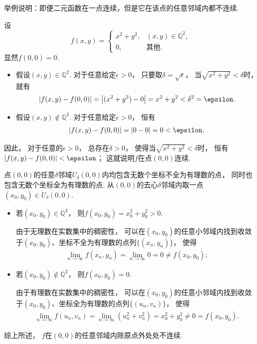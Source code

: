 \begin{example}
举例说明：即便二元函数在一点连续，但是它在该点的任意邻域内都不连续.
\begin{solution}
设\begin{equation*}
	f(x,y) = \begin{cases}
		x^2+y^2, & (x,y) \in \mathbb{Q}^2, \\
		0, & \text{其他}.
	\end{cases}
\end{equation*}
显然\(f(0,0) = 0\).

\begin{itemize}
	\item 假设\((x,y) \in \mathbb{Q}^2\).
	对于任意给定\(\epsilon > 0\)，
	只要取\(\delta = \sqrt{\epsilon}\)，
	当\(\sqrt{x^2+y^2} < \delta\)时，
	就有\begin{align*}
		\abs{f(x,y) - f(0,0)}
		= \abs{(x^2+y^2) - 0}
		= x^2+y^2
		< \delta^2
		= \epsilon.
	\end{align*}

	\item 假设\((x,y) \notin \mathbb{Q}^2\).
	对于任意给定\(\epsilon > 0\)，
	恒有\begin{align*}
		\abs{f(x,y) - f(0,0)}
		= \abs{0 - 0}
		= 0
		< \epsilon.
	\end{align*}
\end{itemize}
因此，
对于任意的\(\epsilon > 0\)，
总存在\(\delta > 0\)，
使得当\(\sqrt{x^2+y^2} < \delta\)时，
恒有\(\abs{f(x,y) - f(0,0)} < \epsilon\)；
这就说明\(f\)在点\((0,0)\)连续.

点\((0,0)\)的任意\(\delta\)邻域\(U_\delta(0,0)\)内均包含无数个坐标不全为有理数的点，
同时也包含无数个坐标全为有理数的点.
从\((0,0)\)的去心\(\delta\)邻域内取一点\((x_0,y_0) \in \mathring{U}_\delta(0,0)\).
\begin{itemize}
	\item 若\((x_0,y_0) \in \mathbb{Q}^2\)，
	则\(f(x_0,y_0) = x_0^2+y_0^2 > 0\).

	由于无理数在实数集中的稠密性，
	可以在\((x_0,y_0)\)的任意小邻域内找到收敛于\((x_0,y_0)\)、坐标不全为有理数的点列\(\{(x_n,y_n)\}\)，
	使得\begin{align*}
		\lim_{n\to\infty} f(x_n,y_n)
		= \lim_{n\to\infty} 0
		= 0
		\neq f(x_0,y_0);
	\end{align*}

	\item 若\((x_0,y_0) \notin \mathbb{Q}^2\)，
	则\(f(x_0,y_0) = 0\).

	由于有理数在实数集中的稠密性，
	可以在\((x_0,y_0)\)的任意小邻域内找到收敛于\((x_0,y_0)\)、坐标全为有理数的点列\(\{(u_n,v_n)\}\)，
	使得\begin{align*}
		\lim_{n\to\infty} f(u_n,v_n)
		= \lim_{n\to\infty} (u_n^2+v_n^2)
		= x_0^2+y_0^2
		\neq 0
		= f(x_0,y_0).
	\end{align*}
\end{itemize}
综上所述，
\(f\)在\((0,0)\)的任意邻域内除原点外处处不连续.
\end{solution}
\end{example}

